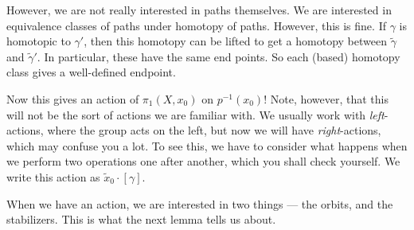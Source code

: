 \documentclass[a4paper]{article}
\begin{document}
However, we are not really interested in paths themselves. We are interested in equivalence classes of paths under homotopy of paths. However, this is fine. If $\gamma$ is homotopic to $\gamma'$, then this homotopy can be lifted to get a homotopy between $\tilde{\gamma}$ and $\tilde{\gamma}'$. In particular, these have the same end points. So each (based) homotopy class gives a well-defined endpoint.
\begin{center}
\end{center}
Now this gives an action of $\pi_1(X, x_0)$ on $p^{-1}(x_0)$! Note, however, that this will not be the sort of actions we are familiar with. We usually work with \emph{left}-actions, where the group acts on the left, but now we will have \emph{right}-actions, which may confuse you a lot. To see this, we have to consider what happens when we perform two operations one after another, which you shall check yourself. We write this action as $\tilde{x}_0 \cdot [\gamma]$.

When we have an action, we are interested in two things --- the orbits, and the stabilizers. This is what the next lemma tells us about.
\end{document}
